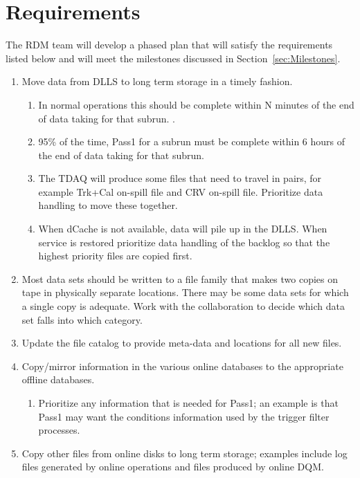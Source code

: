 \chapter{Requirements}
\label{ch:requirements}

The RDM team will develop a phased plan that will satisfy the requirements listed below
and will meet the milestones discussed in Section~\ref{sec:Milestones}.


\begin{enumerate}
\item Move data from DLLS to long term storage in a timely fashion.
  \begin{enumerate}
  \item In normal operations this should be complete within N minutes of the end of data taking for that subrun. .
  \item 95\% of the time, Pass1 for a subrun must be complete within 6 hours of the end of data taking for that subrun.
  \item The TDAQ will produce some files that need to travel in pairs, for example Trk+Cal on-spill file and CRV on-spill file.
    Prioritize data handling to move these together.
  \item When dCache is not available, data will pile up in the DLLS.  When service is restored prioritize data handling of the backlog
    so that the highest priority files are copied first.
  \end{enumerate}
\item Most data sets should be written to a file family that makes two copies on tape in physically separate locations.
  There may be some data sets for which a single copy is adequate.
  Work with the collaboration to decide which data set falls into which category.
\item Update the file catalog to provide meta-data and locations for all new files.
\item Copy/mirror information in the various online databases to the appropriate offline databases.
  \begin{enumerate}
  \item Prioritize any information that is needed for Pass1; an example is that Pass1 may want the conditions information
    used by the trigger filter processes.
  \end{enumerate}
\item Copy other files from online disks to long term storage; examples include log files generated by online
  operations and files produced by online DQM.

\end{enumerate}
